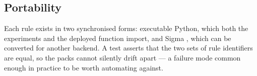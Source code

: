 \subsection{Portability}

Each rule exists in two synchronised forms: executable Python, which both the
experiments and the deployed function import, and Sigma \cite{sigma}, which can
be converted for another backend. A test asserts that the two sets of rule
identifiers are equal, so the packs cannot silently drift apart --- a failure mode
common enough in practice to be worth automating against.
